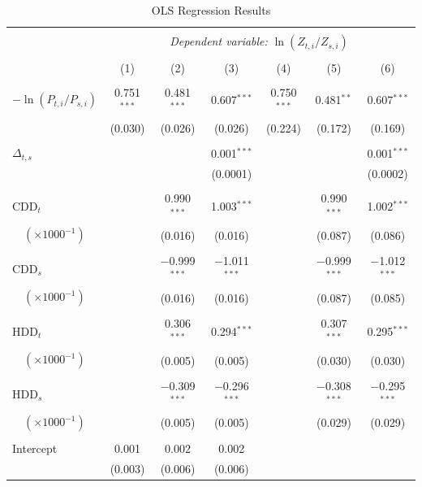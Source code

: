 \documentclass[11pt,a4paper]{extarticle}
\begin{document}
\begin{table}[!htbp] \centering 
	\caption{OLS Regression Results}
	\label{table:1} 
	\small
	\begin{tabular}{@{\extracolsep{5pt}}lcccccc} 
		\\[-4ex]\hline  
		\hline \\[-1.8ex] 
		& \multicolumn{6}{c}{\textit{Dependent variable:} $\ln (Z_{ t, i} / Z_{ s, i})$} \\ [0.5ex]
		\cline{2-7} 
		\\[-1.8ex] & (1) & (2) & (3) & (4) & (5) & (6)\\ [0.5ex]
		\hline \\[-1.8ex] 
		$-\ln (P_{t,i} / P_{s,i})$ & 0.751$^{***}$ & 0.481$^{***}$ & 0.607$^{***}$ & 0.750$^{***}$ & 0.481$^{**}$ & 0.607$^{***}$ \\ 
		& (0.030) & (0.026) & (0.026) & (0.224) & (0.172) & (0.169) \\ 
		& & & & & & \\ 
		$\Delta_{t,s}$ &  &  & 0.001$^{***}$ &  &  & 0.001$^{***}$ \\ 
		&  &  & (0.0001) &  &  & (0.0002) \\ 
		& & & & & & \\ 
		CDD$_t$ &  & 0.990$^{***}$ & 1.003$^{***}$ &  & 0.990$^{***}$ & 1.002$^{***}$ \\ 
		$\quad(\times 1000^{-1})$&  & (0.016) & (0.016) &  & (0.087) & (0.086) \\ 
		& & & & & & \\ 
		CDD$_s$ &  & $-$0.999$^{***}$ & $-$1.011$^{***}$ &  & $-$0.999$^{***}$ & $-$1.012$^{***}$ \\ 
		$\quad(\times 1000^{-1})$&  & (0.016) & (0.016) &  & (0.087) & (0.085) \\ 
		& & & & & & \\ 
		HDD$_t$ &  & 0.306$^{***}$ & 0.294$^{***}$ &  & 0.307$^{***}$ & 0.295$^{***}$ \\ 
		$\quad(\times 1000^{-1})$&  & (0.005) & (0.005) &  & (0.030) & (0.030) \\ 
		& & & & & & \\ 
		HDD$_s$ &  & $-$0.309$^{***}$ & $-$0.296$^{***}$ &  & $-$0.308$^{***}$ & $-$0.295$^{***}$ \\ 
		$\quad(\times 1000^{-1})$&  & (0.005) & (0.005) &  & (0.029) & (0.029) \\ 
		& & & & & & \\ 
		Intercept & 0.001 & 0.002 & 0.002 &  &  &  \\ 
		& (0.003) & (0.006) & (0.006) &  &  &  \\ 

\end{tabular}
\end{table}
\end{document}
